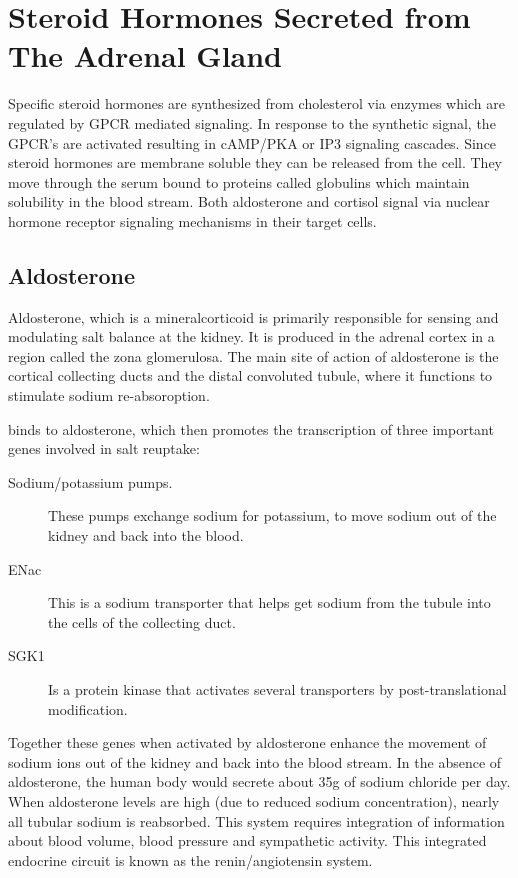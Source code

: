 \documentclass{tufte-handout}
\begin{document}
\section{Steroid Hormones Secreted from The Adrenal Gland}

Specific steroid hormones are synthesized from cholesterol via enzymes which are regulated by GPCR mediated signaling.  In response to the synthetic signal, the GPCR's are activated resulting in cAMP/PKA or IP3 signaling cascades.  Since steroid hormones are membrane soluble they can be released from the cell.  They move through the serum bound to proteins called globulins which maintain solubility in the blood stream.  Both aldosterone and cortisol signal via nuclear hormone receptor signaling mechanisms in their target cells.

\subsection{Aldosterone}

Aldosterone, which is a mineralcorticoid is primarily responsible for sensing and modulating salt balance at the kidney.  It is produced in the adrenal cortex in a region called the zona glomerulosa.  The main site of action of aldosterone is the cortical collecting ducts and the distal convoluted tubule, where it functions to stimulate sodium re-absoroption.  

 binds to aldosterone, which then promotes the transcription of three important genes involved in salt reuptake:

\begin{description}
 \item[Sodium/potassium pumps.]  These pumps exchange sodium for potassium, to move sodium out of the kidney and back into the blood.
 \item[ENac] This is a sodium transporter that helps get sodium from the tubule into the cells of the collecting duct.
 \item[SGK1] Is a protein kinase that activates several transporters by post-translational modification.
\end{description}

Together these genes when activated by aldosterone enhance the movement of sodium ions out of the kidney and back into the blood stream.  In the absence of aldosterone, the human body would secrete about 35g of sodium chloride per day.  When aldosterone levels are high (due to reduced sodium concentration), nearly all tubular sodium is reabsorbed.  This  system requires integration of information about blood volume, blood pressure and sympathetic activity.  This integrated endocrine circuit is known as the renin/angiotensin system.  
\end{document}
